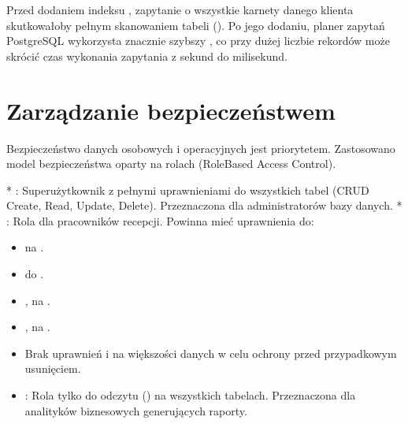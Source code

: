 \documentclass[letterpaper,10pt,polish]{sphinxmanual}
\begin{document}
\sphinxAtStartPar
{}
Przed dodaniem indeksu , zapytanie o wszystkie karnety danego klienta skutkowałoby pełnym skanowaniem tabeli (). Po jego dodaniu, planer zapytań PostgreSQL wykorzysta znacznie szybszy , co przy dużej liczbie rekordów może skrócić czas wykonania zapytania z sekund do milisekund.


\section{Zarządzanie bezpieczeństwem}
\label{\detokenize{rozdzial4/rozdzial4:zarzadzanie-bezpieczenstwem}}
\sphinxAtStartPar
Bezpieczeństwo danych osobowych i operacyjnych jest priorytetem. Zastosowano model bezpieczeństwa oparty na rolach (Role\sphinxhyphen{}Based Access Control).

\sphinxAtStartPar
{}
* : Superużytkownik z pełnymi uprawnieniami do wszystkich tabel (CRUD \sphinxhyphen{} Create, Read, Update, Delete). Przeznaczona dla administratorów bazy danych.
* : Rola dla pracowników recepcji. Powinna mieć uprawnienia do:
\begin{itemize}
\item {} 
\sphinxAtStartPar
{} na .

\item {} 
\sphinxAtStartPar
{} do .

\item {} 
\sphinxAtStartPar
{},  na .

\item {} 
\sphinxAtStartPar
{},  na .

\item {} 
\sphinxAtStartPar
Brak uprawnień  i  na większości danych w celu ochrony przed przypadkowym usunięciem.

\end{itemize}
\begin{itemize}
\item {} 
\sphinxAtStartPar
{}: Rola tylko do odczytu () na wszystkich tabelach. Przeznaczona dla analityków biznesowych generujących raporty.

\end{itemize}
\end{document}
